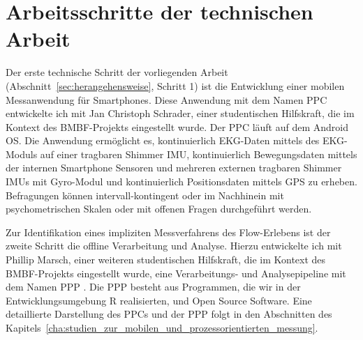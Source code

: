 

\section{Arbeitsschritte der technischen Arbeit} 

\label{sec:arbeitsschritte_der_technischen_arbeit}

Der erste technische Schritt der vorliegenden Arbeit (Abschnitt~\ref{sec:herangehensweise}, Schritt 1) ist die Entwicklung einer mobilen Messanwendung für Smartphones. Diese Anwendung mit dem Namen \ac{PPC} \citep{Bogutzky2016} entwickelte ich mit Jan Christoph Schrader, einer studentischen Hilfskraft, die im Kontext des \acs{BMBF}-Projekts eingestellt wurde. Der \ac{PPC} läuft auf dem Android OS. Die Anwendung ermöglicht es, kontinuierlich \ac{EKG}-Daten mittels des \ac{EKG}-Moduls auf einer tragbaren Shimmer \ac{IMU}, kontinuierlich Bewegungsdaten mittels der internen Smartphone Sensoren und mehreren externen tragbaren Shimmer \ac{IMU}s mit Gyro-Modul und kontinuierlich Positionsdaten mittels \acs{GPS} zu erheben. Befragungen können intervall-kontingent oder im Nachhinein mit psychometrischen Skalen oder mit offenen Fragen durchgeführt werden.

Zur Identifikation eines impliziten Messverfahrens des Flow-Erlebens ist der zweite Schritt die offline Verarbeitung und Analyse. Hierzu entwickelte ich mit Phillip Marsch, einer weiteren studentischen Hilfskraft, die im Kontext des \acs{BMBF}-Projekts eingestellt wurde, eine Verarbeitungs- und Analysepipeline mit dem Namen \ac{PPP} \citep{Bogutzky2016a}. Die \ac{PPP} besteht aus Programmen, die wir in der Entwicklungsumgebung R realisierten, und Open Source Software. Eine detaillierte Darstellung des \ac{PPC}s und der \ac{PPP} folgt in den Abschnitten des Kapitels~\ref{cha:studien_zur_mobilen_und_prozessorientierten_messung}.

